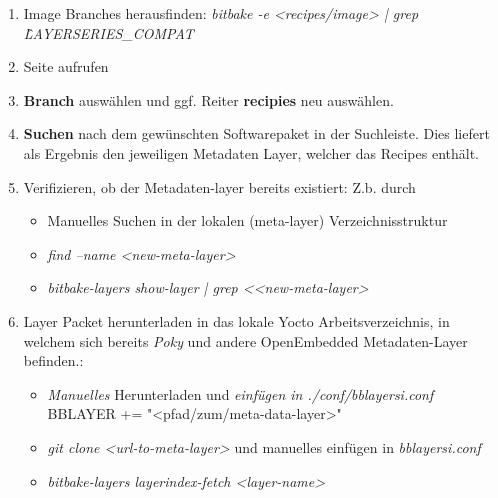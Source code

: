 \begin{enumerate}
    \item Image Branches herausfinden:
        \textit{bitbake -e <recipes/image> | grep \^LAYERSERIES\_COMPAT}

    \item Seite \cite{OpenEmbedded:Indexer_Recipes} aufrufen

    \item \textbf{Branch} auswählen und ggf. Reiter \textbf{recipies} neu
        auswählen.

    \item \textbf{Suchen} nach dem gewünschten Software\-paket in der Suchleiste.
        Dies liefert als Ergebnis den jeweiligen Metadaten Layer, welcher das
        Recipes enthält.

    \item Verifizieren, ob der Metadaten-layer bereits existiert: Z.b. durch
        \begin{itemize}
            \item Manuelles Suchen in der lokalen (meta-layer) Verzeichnisstruktur
            \item \textit{find --name <new-meta-layer>}
            \item \textit{bitbake-layers show-layer | grep <<new-meta-layer>}
        \end{itemize}

    \item Layer Packet herunterladen in das lokale Yocto Arbeitsverzeichnis, in
        welchem sich bereits \textit{Poky} und andere OpenEmbedded
        Metadaten-Layer befinden.:
        \begin{itemize}
            \item \textit{Manuelles} Herunterladen und
                \textit{einfügen in ./conf/bblayersi.conf}
                BBLAYER += "<pfad/zum/meta-data-layer>"
            \item \textit{git clone <url-to-meta-layer>} und manuelles einfügen
                                        in \textit{bblayersi.conf}
            \item \textit{bitbake-layers layerindex-fetch <layer-name>}
        \end{itemize}


\end{enumerate}
